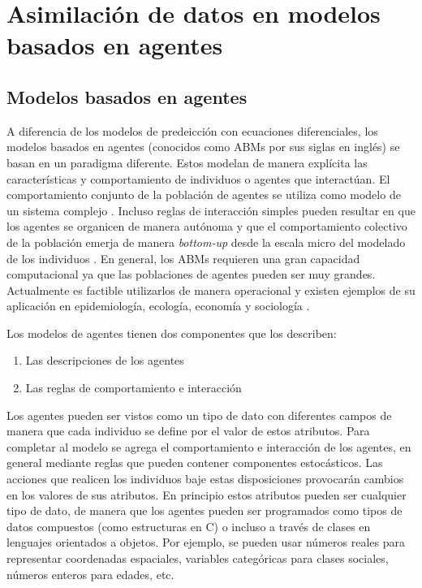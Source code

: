 \chapter{Asimilación de datos en modelos basados en agentes}

\section{Modelos basados en agentes}

A diferencia de los modelos de predeicción con ecuaciones diferenciales, los modelos basados en agentes (conocidos como ABMs por sus siglas en inglés) se basan en un paradigma diferente. Estos modelan de manera explícita las características y comportamiento de individuos o agentes que interactúan. El comportamiento conjunto de la población de agentes se utiliza como modelo de un sistema complejo \citep{Bonabeau2002}. Incluso reglas de interacción simples pueden resultar en que los agentes se organicen de manera autónoma y que el comportamiento colectivo de la población emerja de manera \textit{bottom-up} desde la escala micro del modelado de los individuos \citep{Helbing2012}. En general, los ABMs requieren una gran capacidad computacional ya que las poblaciones de agentes pueden ser muy grandes. Actualmente es factible utilizarlos de manera operacional y existen ejemplos de su aplicación en epidemiología, ecología, economía y sociología \citep{Vynnycky2010, Grimm2005, Tesfatsion2006, Epstein1996}.

Los modelos de agentes tienen dos componentes que los describen: 
\begin{enumerate}
    \item Las descripciones de los agentes
    \item Las reglas de comportamiento e interacción
\end{enumerate}
Los agentes pueden ser vistos como un tipo de dato con diferentes campos de manera que cada individuo se define por el valor de estos atributos. Para completar al modelo se agrega el comportamiento e interacción de los agentes, en general mediante reglas que pueden contener componentes estocásticos. Las acciones que realicen los individuos baje estas disposiciones provocarán cambios en los valores de sus atributos. En principio estos atributos pueden ser cualquier tipo de dato, de manera que los agentes pueden ser programados como tipos de datos compuestos (como estructuras en C) o incluso a través de clases en lenguajes orientados a objetos. Por ejemplo, se pueden usar números reales para representar coordenadas espaciales, variables categóricas para clases sociales, números enteros para edades, etc.

